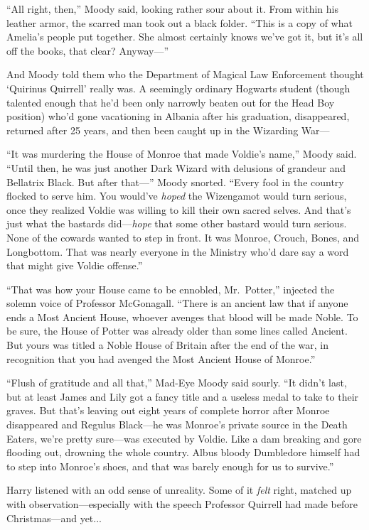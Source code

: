 “All right, then,” Moody said, looking rather sour about it. From within his leather armor, the scarred man took out a black folder. “This is a copy of what Amelia’s people put together. She almost certainly knows we’ve got it, but it’s all off the books, that clear? Anyway—”

And Moody told them who the Department of Magical Law Enforcement thought ‘Quirinus Quirrell’ really was. A seemingly ordinary Hogwarts student (though talented enough that he’d been only narrowly beaten out for the Head Boy position) who’d gone vacationing in Albania after his graduation, disappeared, returned after 25 years, and then been caught up in the Wizarding War—

“It was murdering the House of Monroe that made Voldie’s name,” Moody said. “Until then, he was just another Dark Wizard with delusions of grandeur and Bellatrix Black. But after that—” Moody snorted. “Every fool in the country flocked to serve him. You would’ve \emph{hoped} the Wizengamot would turn serious, once they realized Voldie was willing to kill their own sacred selves. And that’s just what the bastards did—\emph{hope} that some other bastard would turn serious. None of the cowards wanted to step in front. It was Monroe, Crouch, Bones, and Longbottom. That was nearly everyone in the Ministry who’d dare say a word that might give Voldie offense.”

“That was how your House came to be ennobled, Mr.~Potter,” injected the solemn voice of Professor McGonagall. “There is an ancient law that if anyone ends a Most Ancient House, whoever avenges that blood will be made Noble. To be sure, the House of Potter was already older than some lines called Ancient. But yours was titled a Noble House of Britain after the end of the war, in recognition that you had avenged the Most Ancient House of Monroe.”

“Flush of gratitude and all that,” Mad-Eye Moody said sourly. “It didn’t last, but at least James and Lily got a fancy title and a useless medal to take to their graves. But that’s leaving out eight years of complete horror after Monroe disappeared and Regulus Black—he was Monroe’s private source in the Death Eaters, we’re pretty sure—was executed by Voldie. Like a dam breaking and gore flooding out, drowning the whole country. Albus bloody Dumbledore himself had to step into Monroe’s shoes, and that was barely enough for us to survive.”

Harry listened with an odd sense of unreality. Some of it \emph{felt} right, matched up with observation—especially with the speech Professor Quirrell had made before Christmas—and yet...

